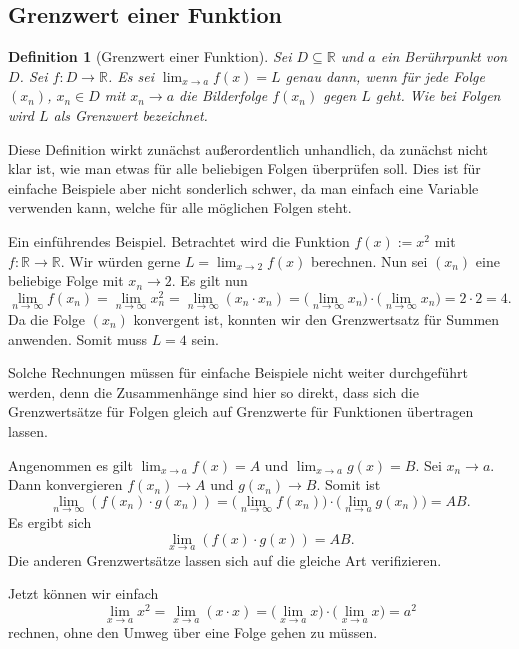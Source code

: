 \documentclass[a4paper,11pt,fleqn,twoside]{scrartcl}
\numberwithin{equation}{section}
\newcommand{\R}{\mathbb R}
\theoremstyle{rmbox}
\newtheorem{Definition}{Definition}
\begin{document}
\subsection{Grenzwert einer Funktion}
\begin{Definition}[Grenzwert einer Funktion]
Sei $D\subseteq\R$ und $a$ ein Berührpunkt von $D$.
Sei $f\colon D\to\R$. Es sei $\lim_{x\to a} f(x)=L$ genau dann,
wenn für jede Folge $(x_n)$, $x_n\in D$ mit $x_n\to a$ die
Bilderfolge $f(x_n)$ gegen $L$ geht. Wie bei Folgen wird $L$ als
\emph{Grenzwert} bezeichnet.
\end{Definition}
Diese Definition wirkt zunächst außerordentlich unhandlich, da
zunächst nicht klar ist, wie man etwas für alle beliebigen
Folgen überprüfen soll. Dies ist für einfache Beispiele aber nicht
sonderlich schwer, da man einfach eine Variable verwenden
kann, welche für alle möglichen Folgen steht.

Ein einführendes Beispiel. Betrachtet wird die Funktion $f(x):=x^2$
mit $f\colon\R\to\R$. Wir würden gerne $L=\lim_{x\to 2} f(x)$
berechnen. Nun sei $(x_n)$ eine beliebige Folge mit $x_n\to 2$. Es
gilt nun
\begin{equation}
\lim_{n\to\infty} f(x_n)
= \lim_{n\to\infty} x_n^2
= \lim_{n\to\infty} (x_n\cdot x_n)
= \Big(\lim_{n\to\infty} x_n\Big)\cdot\Big(\lim_{n\to\infty} x_n\Big)
= 2\cdot 2 = 4.
\end{equation}
Da die Folge $(x_n)$ konvergent ist, konnten wir den Grenzwertsatz
für Summen anwenden. Somit muss $L=4$ sein.

Solche Rechnungen müssen für einfache Beispiele nicht weiter
durchgeführt werden, denn die Zusammenhänge sind hier so direkt, dass
sich die Grenzwertsätze für Folgen gleich auf Grenzwerte für
Funktionen übertragen lassen.

Angenommen es gilt $\lim_{x\to a} f(x)=A$ und
$\lim_{x\to a} g(x) = B$. Sei $x_n\to a$. Dann konvergieren
$f(x_n)\to A$ und $g(x_n)\to B$. Somit ist
\begin{equation}
\lim_{n\to\infty} (f(x_n)\cdot g(x_n))
= \Big(\lim_{n\to\infty} f(x_n)\Big)\cdot \Big(\lim_{n\to a} g(x_n)\Big)
= AB.
\end{equation}
Es ergibt sich
\begin{equation}
\lim_{x\to a} (f(x)\cdot g(x)) = AB.
\end{equation}
Die anderen Grenzwertsätze lassen sich auf die gleiche Art
verifizieren.

Jetzt können wir einfach
\begin{equation}\label{eq:Grenzwert-Quadrat}
\lim_{x\to a} x^2 = \lim_{x\to a} (x\cdot x)
= \Big(\lim_{x\to a} x\Big)\cdot\Big(\lim_{x\to a} x\Big) = a^2
\end{equation}
rechnen, ohne den Umweg über eine Folge gehen zu müssen.
\end{document}
